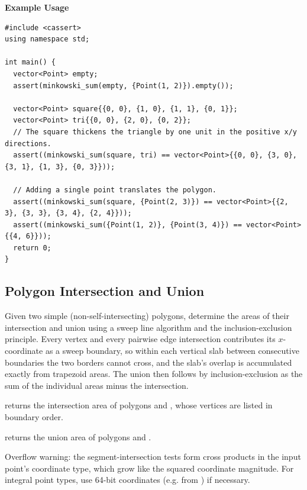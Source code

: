 \textbf{Example Usage}\par
\begin{lstlisting}[style=cpp]
#include <cassert>
using namespace std;

int main() {
  vector<Point> empty;
  assert(minkowski_sum(empty, {Point(1, 2)}).empty());

  vector<Point> square{{0, 0}, {1, 0}, {1, 1}, {0, 1}};
  vector<Point> tri{{0, 0}, {2, 0}, {0, 2}};
  // The square thickens the triangle by one unit in the positive x/y directions.
  assert((minkowski_sum(square, tri) == vector<Point>{{0, 0}, {3, 0}, {3, 1}, {1, 3}, {0, 3}}));

  // Adding a single point translates the polygon.
  assert((minkowski_sum(square, {Point(2, 3)}) == vector<Point>{{2, 3}, {3, 3}, {3, 4}, {2, 4}}));
  assert((minkowski_sum({Point(1, 2)}, {Point(3, 4)}) == vector<Point>{{4, 6}}));
  return 0;
}
\end{lstlisting}
\subsection{Polygon Intersection and Union}
\label{sec:7.4.4}
Given two simple (non-self-intersecting) polygons, determine the areas of their intersection and union using a sweep line algorithm and the inclusion-exclusion principle. Every vertex and every pairwise edge intersection contributes its $x$-coordinate as a sweep boundary, so within each vertical slab between consecutive boundaries the two borders cannot cross, and the slab's overlap is accumulated exactly from trapezoid areas. The union then follows by inclusion-exclusion as the sum of the individual areas minus the intersection.

\begin{compactitem}
  \item {} returns the intersection area of polygons  and , whose vertices are listed in boundary order.
  \item {} returns the union area of polygons  and .
\end{compactitem}

Overflow warning: the segment-intersection tests form cross products in the input point's coordinate type, which grow like the squared coordinate magnitude. For integral point types, use 64-bit coordinates (e.g.  from ) if necessary.

